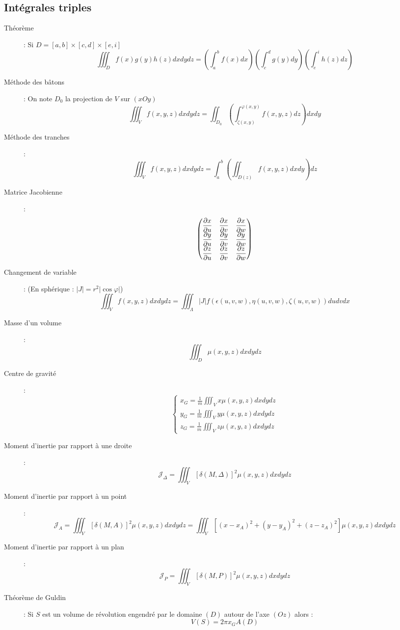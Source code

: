 \subsection{Intégrales triples}
\begin{description}
\item[Théorème] : Si $D=[a,b]\times[c,d]\times[e,i]$
    \[
        \iiint_Df(x)g(y)h(z)dxdydz=
        \left(\int_a^bf(x)dx\right)
        \left(\int_c^dg(y)dy\right)
        \left(\int_e^ih(z)dz\right)
    \]
\item[Méthode des bâtons] : On note $D_0$ la projection de $V$ sur $(xOy)$
    \[
        \iiint_Vf(x,y,z)dxdydz=
        \iint_{D_0}\left(\int_{\zeta(x,y)}^{\varphi(x,y)}f(x,y,z)dz\right)dxdy
    \]
\item[Méthode des tranches] :
    \[
        \iiint_Vf(x,y,z)dxdydz=
        \int_a^b\left(\iint_{D(z)}f(x,y,z)dxdy\right)dz
    \]
\item[Matrice Jacobienne] :
    \[
        \begin{pmatrix}
            \dfrac{\partial x}{\partial u} & \dfrac{\partial x}{\partial v} & \dfrac{\partial x}{\partial w}\\
            \dfrac{\partial y}{\partial u} & \dfrac{\partial y}{\partial v} & \dfrac{\partial y}{\partial w}\\
            \dfrac{\partial z}{\partial u} & \dfrac{\partial z}{\partial v} & \dfrac{\partial z}{\partial w}\\
        \end{pmatrix}
    \]
\item[Changement de variable] : (En sphérique : $|J|=r^2|\cos\varphi|$)
    \[
        \iiint_Vf(x,y,z)dxdydz=
        \iiint_\Lambda|J|f(
            \epsilon(u,v,w),
            \eta(u,v,w),
            \zeta(u,v,w)
        )dudvdx
    \]
\item[Masse d'un volume] :
    \[
        \iiint_D\mu(x,y,z)dxdydz
    \]
\item[Centre de gravité] :
    \[
        \begin{cases}
            x_G=\frac{1}{m}\iiint_Vx\mu(x,y,z)dxdydz\\
            y_G=\frac{1}{m}\iiint_Vy\mu(x,y,z)dxdydz\\
            z_G=\frac{1}{m}\iiint_Vz\mu(x,y,z)dxdydz
        \end{cases}
    \]
\item[Moment d'inertie par rapport à une droite] :
    \[
        \mathcal J_\Delta=
        \iiint_V[\delta(M,\Delta)]^2\mu(x,y,z)dxdydz
    \]
\item[Moment d'inertie par rapport à un point] :
    \[
        \mathcal J_A=
        \iiint_V[\delta(M,A)]^2\mu(x,y,z)dxdydz
        =\iiint_V [(x-x_A)^2+(y-y_A)^2+(z-z_A)^2]\mu(x,y,z)dxdydz
    \]
\item[Moment d'inertie par rapport à un plan] :
    \[
        \mathcal J_P=
        \iiint_V[\delta(M,P)]^2\mu(x,y,z)dxdydz
    \]
\item[Théorème de Guldin] : Si $S$ est un volume de révolution engendré par le domaine $(D)$ autour de l'axe $(Oz)$ alors :
    \[
        V(S)=2\pi x_GA(D)
    \]
\end{description}
